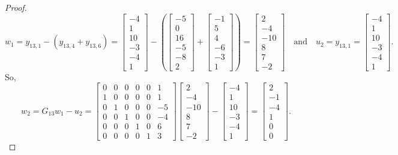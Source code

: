 \begin{proof}
$$
w_1 =y_{13,1}-(y_{13,4}+y_{13,6})=
\begin{bmatrix}
-4 \\ 1 \\ 10 \\ -3 \\ -4 \\ 1
\end{bmatrix}
-
\left(
\begin{bmatrix}
-5 \\ 0 \\ 16 \\ -5 \\ -8 \\ 2
\end{bmatrix}
+
\begin{bmatrix}
-1 \\ 5 \\ 4 \\ -6 \\ -3 \\ 1
\end{bmatrix}
\right)=\begin{bmatrix} 2 \\ -4 \\ -10 \\ 8 \\ 7 \\ -2\end{bmatrix}
 \quad \mbox{and} \quad u_{2} = y_{13,1}= \begin{bmatrix}
-4 \\ 1 \\ 10 \\ -3 \\ -4 \\ 1
\end{bmatrix}.
$$
So, 
\[
w_2 = G_{13} w_1 - u_2 = 
\begin{bmatrix}
0 & 0 & 0 & 0 & 0 & 1 \\
1 & 0 & 0 & 0 & 0 & 1 \\
0 & 1 & 0 & 0 & 0 & -5 \\
0 & 0 & 1 & 0 & 0 & -4 \\
0 & 0 & 0 & 1 & 0 & 6 \\
0 & 0 & 0 & 0 & 1 & 3 
\end{bmatrix}
\begin{bmatrix} 2 \\ -4 \\ -10 \\ 8 \\ 7 \\ -2\end{bmatrix} -
\begin{bmatrix} -4 \\ 1 \\ 10 \\ -3 \\ -4 \\ 1 \end{bmatrix} =
\begin {bmatrix} 2 \\-1 \\ -4 \\ 1 \\ 0 \\ 0 \end{bmatrix}.
\]


\end{proof}
